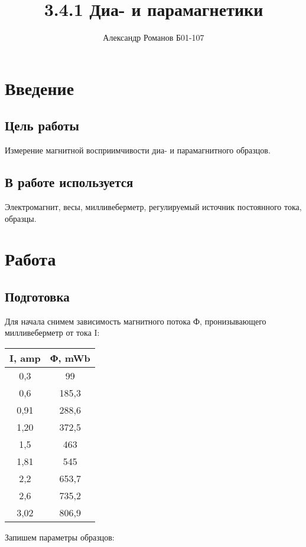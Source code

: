 \documentclass{article}
\author{Александр Романов Б01-107}
\date{}
\title{3.4.1 Диа- и парамагнетики}
\begin{document}
\maketitle

\section{Введение}

    \subsection{Цель работы}
    Измерение магнитной восприимчивости диа- и парамагнитного образцов.

    \subsection{В работе используется}
    Электромагнит, весы, милливеберметр, регулируемый источник постоянного тока, образцы.

\section{Работа}
    \subsection {Подготовка}
    Для начала снимем зависимость магнитного потока Ф, пронизывающего милливеберметр от тока I:

    \begin{table}[H]
        \centering
    \begin{tabular}{|c|c|}
        \hline
        I, amp & Ф, mWb \\\hline
        0,3  & 99     \\\hline
        0,6  & 185,3  \\\hline
        0,91 & 288,6  \\\hline
        1,20 & 372,5  \\\hline
        1,5  & 463    \\\hline
        1,81 & 545    \\\hline
        2,2  & 653,7  \\\hline
        2,6  & 735,2  \\\hline
        3,02 & 806,9  \\\hline
    \end{tabular}
    \end{table}

    Запишем параметры образцов:
\end{document}

